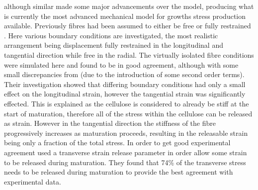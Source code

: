 \cite{Alm_ras_2005}
although similar made some major advancements over the \cite{Yamamoto_1998} model,
producing what is currently the most advanced mechanical model for growths
stress production available. Previously fibres had been assumed to either be
free \cite{Yamamoto_1998} or fully restrained \cite{archer1987}\cite{archer1989}. Here
various boundary conditions are investigated, the most realistic arrangement being
displacement fully restrained in the longitudinal and tangential direction while
free in the radial. The virtually isolated fibre conditions were simulated here
and found to be in good agreement, although with some small discrepancies from
\cite{Yamamoto_1998} (due to the introduction of some second order terms).  Their
investigation showed that differing boundary conditions had only a small effect
on the longitudinal strain, however the tangential strain was significantly
effected. This is explained as the cellulose is considered to already be stiff at
the start of maturation, therefore all of the stress within the cellulose can be
released as strain. However in the tangential direction the stiffness of the
fibre progressively increases as maturation proceeds, resulting in the
releasable strain being only a fraction of the total stress. In order to get good
experimental agreement \cite{Alm_ras_2005} used a transverse strain release
parameter in order allow some strain to be released during maturation. They
found that 74\% of the transverse stress needs to be released during maturation
to provide the best agreement with experimental data.